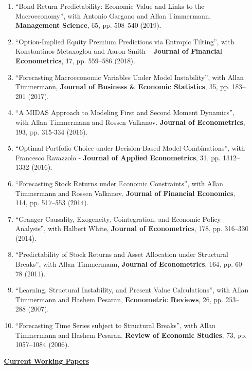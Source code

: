 \documentclass[12pt]{article}
\begin{document}
\begin{enumerate}
		\item ``Bond Return Predictability: Economic Value and Links to the Macroeconomy'', with Antonio Gargano and Allan Timmermann, \textbf{Management Science}, 65, pp. 508--540 (2019).
	\item ``Option-Implied Equity Premium Predictions via Entropic Tilting'', with Konstantinos Metaxoglou  and Aaron Smith -- \textbf{Journal of Financial Econometrics}, 17, pp. 559--586  (2018).
	
		  \item ``Forecasting Macroeconomic Variables Under Model Instability'', with Allan Timmermann, \textbf{Journal of Business \& Economic Statistics}, 35, pp. 183--201  (2017). 
	\item ``A MIDAS Approach to Modeling First and Second Moment Dynamics'', with Allan Timmermann and Rossen Valkanov, \textbf{Journal of Econometrics}, 193, pp. 315-334 (2016).
	\item ``Optimal Portfolio Choice under Decision-Based Model Combinations'', with Francesco Ravazzolo - \textbf{Journal of Applied Econometrics}, 31, pp. 1312--1332 (2016).
	\item ``Forecasting Stock Returns under Economic Constraints'', with Allan Timmermann and Rossen Valkanov, \textbf{Journal of Financial Economics}, 114, pp. 517--553 (2014). 
	\item ``Granger Causality, Exogeneity, Cointegration, and Economic Policy Analysis'', with Halbert White, \textbf{Journal of Econometrics}, 178, pp. 316--330 (2014). 
	\item ``Predictability of Stock Returns and Asset Allocation under Structural Breaks'', with Allan Timmermann, \textbf{Journal of Econometrics}, 164, pp. 60--78 (2011). 
	\item ``Learning, Structural Instability, and Present Value Calculations'', with Allan Timmermann and Hashem Pesaran, \textbf{Econometric Reviews}, 26, pp. 253--288 (2007). 
	\item ``Forecasting Time Series subject to Structural Breaks'', with Allan Timmermann and Hashem Pesaran, \textbf{Review of Economic Studies}, 73, pp. 1057--1084 (2006). 

    \setcounter{enumTemp}{\theenumi}
 \end{enumerate}
\underline{\textbf{Current Working Papers}}
\end{document}
